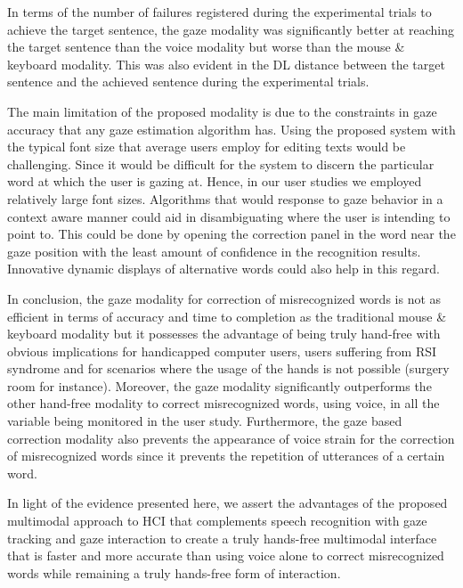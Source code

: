 \documentclass[]{article}
\begin{document}
In terms of the number of failures registered during the experimental trials to achieve the target sentence, the gaze
modality was significantly better at reaching the target sentence than the voice modality but worse than the mouse \&
keyboard modality. This was also evident in the DL distance between the target sentence and the achieved sentence during
the experimental trials.


The main limitation of the proposed modality is due to the constraints in gaze accuracy that any gaze estimation
algorithm  has. Using the proposed system with the typical font size  that average users employ for editing texts  would
be challenging. Since it would be difficult for the system to discern the particular word at which the user is gazing
at. Hence, in our user studies we employed relatively large font sizes. Algorithms that would response to gaze behavior
in a context aware manner could aid in disambiguating where the user is intending to point to. This could be done by
opening the correction panel in the word near the gaze position with the least amount of confidence in the
recognition results. Innovative dynamic displays of alternative words could also help in this regard.


In conclusion, the gaze modality for correction of misrecognized words is not as efficient in terms of accuracy and time
to completion as the traditional mouse \& keyboard modality but it possesses the advantage of being truly hand-free with
obvious  implications for handicapped computer users, users suffering from RSI syndrome and for scenarios where the
usage of the hands is not possible (surgery room for instance). Moreover, the gaze modality significantly outperforms
the other hand-free modality to correct misrecognized words, using voice, in all the variable being monitored in the
user study. Furthermore, the gaze based correction modality also prevents the appearance of voice strain for the correction
of misrecognized words since it prevents the  repetition of utterances of a certain word.

In light of the evidence presented here, we assert the advantages of the proposed multimodal approach to HCI that
complements speech recognition with gaze tracking and gaze interaction to create a truly hands-free multimodal interface that is
faster and more accurate than using voice alone to correct misrecognized words while remaining a truly hands-free form
of interaction.




\end{document}

